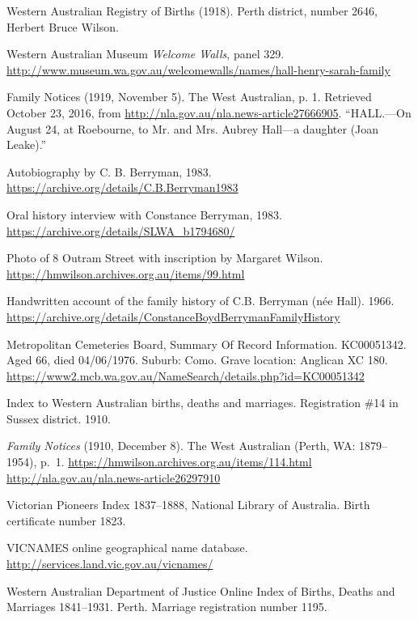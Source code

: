 \begin{thebibliography}{999}
\footnotesize

    Western Australian Registry of Births (1918). Perth district, number 2646, Herbert Bruce Wilson.

	Western Australian Museum \emph{Welcome Walls}, panel 329.
	\url{http://www.museum.wa.gov.au/welcomewalls/names/hall-henry-sarah-family}

	Family Notices (1919, November 5). The West Australian, p. 1.
	Retrieved October 23, 2016, from \url{http://nla.gov.au/nla.news-article27666905}.
	``HALL.---On August 24, at Roebourne, to Mr. and Mrs. Aubrey Hall---a daughter (Joan Leake).''

	Autobiography by C. B. Berryman, 1983.
	\url{https://archive.org/details/C.B.Berryman1983}

	Oral history interview with Constance Berryman, 1983.
	\url{https://archive.org/details/SLWA_b1794680/}

	Photo of 8 Outram Street with inscription by Margaret Wilson.
	\url{https://hmwilson.archives.org.au/items/99.html}

	Handwritten account of the family history of C.B. Berryman (n\'{e}e Hall). 1966.
	\url{https://archive.org/details/ConstanceBoydBerrymanFamilyHistory}

	Metropolitan Cemeteries Board, Summary Of Record Information. KC00051342.
	Aged 66, died 04/06/1976. Suburb: Como.
	Grave location: Anglican XC 180.
	\url{https://www2.mcb.wa.gov.au/NameSearch/details.php?id=KC00051342}

	Index to Western Australian births, deaths and marriages.
	Registration \#14 in Sussex district. 1910.

	\emph{Family Notices} (1910, December 8). The West Australian (Perth, WA: 1879--1954), p.\ 1.
	\url{https://hmwilson.archives.org.au/items/114.html}
	\url{http://nla.gov.au/nla.news-article26297910}

	Victorian Pioneers Index 1837--1888, National Library of Australia.
	Birth certificate number 1823.

	VICNAMES online geographical name database.
	\url{http://services.land.vic.gov.au/vicnames/}

	Western Australian Department of Justice Online Index of Births, Deaths and Marriages 1841–1931.
	Perth. Marriage registration number 1195.


\end{thebibliography}
